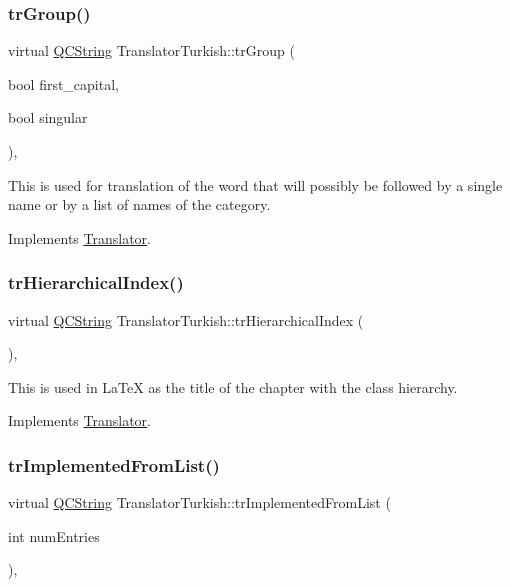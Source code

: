 \subsubsection{\texorpdfstring{trGroup()}{trGroup()}}
{\footnotesize\ttfamily virtual \mbox{\hyperlink{class_q_c_string}{Q\+C\+String}} Translator\+Turkish\+::tr\+Group (\begin{DoxyParamCaption}\item[{bool}]{first\+\_\+capital,  }\item[{bool}]{singular }\end{DoxyParamCaption})\hspace{0.3cm}{\ttfamily [inline]}, {\ttfamily [virtual]}}

This is used for translation of the word that will possibly be followed by a single name or by a list of names of the category. 

Implements \mbox{\hyperlink{class_translator}{Translator}}.

\mbox{\label{class_translator_turkish_a0437e1debfef050eb35d50552efb7295}} 
\subsubsection{\texorpdfstring{trHierarchicalIndex()}{trHierarchicalIndex()}}
{\footnotesize\ttfamily virtual \mbox{\hyperlink{class_q_c_string}{Q\+C\+String}} Translator\+Turkish\+::tr\+Hierarchical\+Index (\begin{DoxyParamCaption}{ }\end{DoxyParamCaption})\hspace{0.3cm}{\ttfamily [inline]}, {\ttfamily [virtual]}}

This is used in La\+TeX as the title of the chapter with the class hierarchy. 

Implements \mbox{\hyperlink{class_translator}{Translator}}.

\mbox{\label{class_translator_turkish_a6347ce3cc1af4fa066efbfa7261ef377}} 
\subsubsection{\texorpdfstring{trImplementedFromList()}{trImplementedFromList()}}
{\footnotesize\ttfamily virtual \mbox{\hyperlink{class_q_c_string}{Q\+C\+String}} Translator\+Turkish\+::tr\+Implemented\+From\+List (\begin{DoxyParamCaption}\item[{int}]{num\+Entries }\end{DoxyParamCaption})\hspace{0.3cm}{\ttfamily [inline]}, {\ttfamily [virtual]}}

